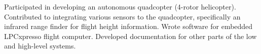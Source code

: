 {
    Participated in developing an autonomous quadcopter (4-rotor helicopter). Contributed to integrating various sensors to the quadcopter, specifically an infrared range finder for flight height information. Wrote software for embedded LPCxpresso flight computer. Developed documentation for other parts of the low and high-level systems.
}
